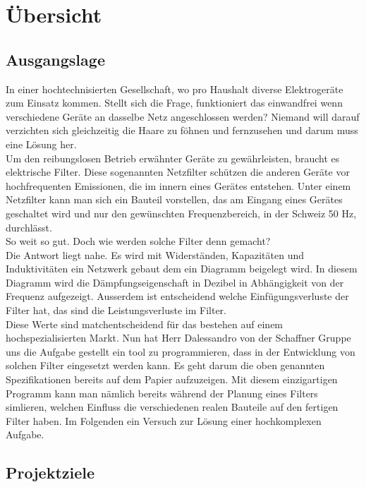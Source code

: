 \section{Übersicht} \label{sec:uebersicht}
\subsection{Ausgangslage}


In einer hochtechnisierten Gesellschaft, wo pro Haushalt diverse Elektrogeräte zum Einsatz kommen. Stellt sich die Frage, funktioniert das einwandfrei wenn verschiedene Geräte an dasselbe Netz angeschlossen werden?
Niemand will darauf verzichten sich gleichzeitig die Haare zu föhnen und fernzusehen und darum muss eine Lösung her. \\ Um den reibungslosen Betrieb erwähnter Geräte zu gewährleisten, braucht es elektrische Filter. Diese sogenannten Netzfilter schützen die anderen Geräte vor hochfrequenten Emissionen, die im innern eines Gerätes entstehen. Unter einem Netzfilter kann man sich ein Bauteil vorstellen, das am Eingang eines Gerätes geschaltet wird und nur den gewünschten Frequenzbereich, in der Schweiz 50 Hz, durchlässt. \\ So weit so gut. Doch wie werden solche Filter denn gemacht? \\
Die Antwort liegt nahe. Es wird mit Widerständen, Kapazitäten und Induktivitäten ein Netzwerk gebaut dem ein Diagramm beigelegt wird. In diesem Diagramm wird die Dämpfungseigenschaft in Dezibel in Abhängigkeit von der Frequenz aufgezeigt. Ausserdem ist entscheidend welche Einfügungsverluste der Filter hat, das sind die Leistungsverluste im Filter. \\
Diese Werte sind matchentscheidend für das bestehen auf einem hochspezialisierten Markt. 
Nun hat Herr Dalessandro von der Schaffner Gruppe uns die Aufgabe gestellt ein tool zu programmieren, dass in der Entwicklung von solchen Filter eingesetzt werden kann. Es geht darum die oben genannten Spezifikationen bereits auf dem Papier aufzuzeigen. Mit diesem einzigartigen Programm kann man nämlich bereits während der Planung eines Filters simlieren, welchen Einfluss die verschiedenen realen Bauteile auf den fertigen Filter haben.
Im Folgenden ein Versuch zur Lösung einer hochkomplexen Aufgabe. 
 

\newpage
\subsection{Projektziele} \label{subsec:projektziele}



